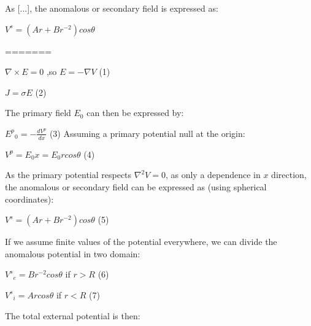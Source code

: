 \documentclass[11pt,letterpaper,leqno]{amsart}
\numberwithin{equation}{section}
\begin{document}
As [...], the anomalous or secondary field is expressed as:

$V^s=(A r + B r^{-2}) cos\theta$

\vspace{0.4cm}
=======
 \vspace{0.4cm}


$\nabla \times E =0$ \quad,so \quad $E=-\nabla V$	\quad	(1)

\vspace{0.4cm}

$J=\sigma E$ \quad (2)


\vspace{0.4cm}



The primary field $E_0$ can then be expressed by:

\vspace{0.4cm}

${E^p}_0=-\frac{dV^p}{dx}$ \quad (3)
\vspace{0.4cm}
Assuming a primary potential null at the origin:

 \vspace{0.4cm}


$V^p=E_0x=E_0 r cos\theta$ \quad (4)

 \vspace{0.4cm}



As the primary potential respects $\nabla^2 V=0 $, as only a dependence in $x$ direction, the anomalous or secondary field can be expressed as (using spherical coordinates):

 \vspace{0.4cm}


$V^s=(A r + B r^{-2}) cos\theta$ \quad (5)


\vspace{0.4cm}

If we assume finite  values of the potential everywhere, we can divide the anomalous potential in two domain:

 \vspace{0.4cm}


${V^s}_e=B r^{-2} cos\theta$ \quad if $r>R$ \quad (6)

 \vspace{0.4cm}


${V^s}_i=A r cos\theta$ \quad if $r<R$ \quad (7)

 \vspace{0.4cm}



The total external potential is then:
\end{document}
